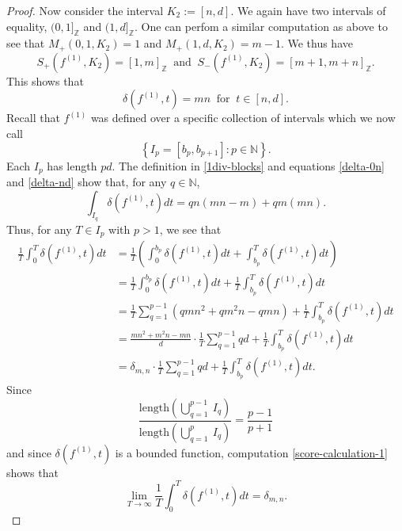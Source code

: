 \documentclass[reqno,11pt]{amsart}
\theoremstyle{plain}
\theoremstyle{definition}
\theoremstyle{remark}
\numberwithin{equation}{section}
\newcommand{\Z}{{\mathbb{Z}}}
\newcommand{\N}{{\mathbb{N}}}
\begin{document}
\begin{proof}
Now consider the interval $K_2:=[n,d]$. We again have two intervals of equality, $(0,1]_\Z$ and $(1,d]_\Z$.
One can perfom a similar computation as above to see that $M_+(0,1,K_2) = 1$ and $M_+(1,d,K_2) = m-1$.
We thus have
\begin{equation*}
    S_+(f^{(1)}, K_2)  = [1,m]_\Z\ \text{ and }\ S_-(f^{(1)}, K_2) = 
     [m+1, m+n]_\Z.
\end{equation*}
This shows that
\begin{equation}\label{delta-nd}
    \delta(f^{(1)}, t) = mn\ \text{ for }\ t \in [n,d].
\end{equation}
Recall that $f^{(1)}$ was defined over a specific collection of intervals which we now call
\begin{equation*}
    \left\lbrace I_p = [b_p, b_{p+1}]: p \in \N \right\rbrace. \end{equation*}
    Each $I_p$ has length $pd$.
    The definition in \eqref{1div-blocks} and equations \eqref{delta-0n} and \eqref{delta-nd} show that, for any $q \in \N$,
    \begin{equation}
        \int_{I_q} \delta(f^{(1)},t) dt = qn (mn - m) + qm (mn).
    \end{equation}
    Thus, for any $T \in I_p$ with $p >1$, we see that 
    \begin{equation}\label{score-calculation-1}
    \begin{split}
        \frac{1}{T}\int_0^T \delta(f^{(1)}, t) dt &=  \frac{1}{T} \left( \int_0^{b_p} \delta(f^{(1)},t) dt + \int^T_{b_p}\delta(f^{(1)},t) dt\right)
        \\ 
        &=  \frac{1}{T}  \int_0^{b_p} \delta(f^{(1)},t) dt + \frac{1}{T} \int^{T}_{b_p} \delta(f^{(1)}, t) dt
        \\
        &= \frac{1}{T} \sum_{q=1}^{p-1} \left(qmn^2 + qm^2n - qmn  \right) + \frac{1}{T} \int_{b_p}^T \delta(f^{(1)},t)dt
        \\
        &= \frac{mn^2 + m^2n - mn}{d}\cdot \frac{1}{T} \sum_{q=1}^{p-1} qd + \frac{1}{T} \int_{b_p}^T \delta(f^{(1)},t)dt
        \\
        &= \delta_{m,n} \cdot \frac{1}{T} \sum_{q=1}^{p-1} qd + \frac{1}{T} \int_{b_p}^T \delta(f^{(1)},t)dt.
        \end{split} 
    \end{equation}
Since
\begin{equation}\label{add-insignificant}
    \frac{\text{length}\left(\bigcup^{p-1}_{q=1}\ I_q\right)}{\text{length}\left(\bigcup^{p}_{q=1}\ I_q\right)} = \frac{p-1}{p+1}
\end{equation}
and since $\delta(f^{(1)},t)$ is a bounded function,
computation \eqref{score-calculation-1} shows that
\begin{equation}
    \lim_{T\to \infty} \frac{1}{T}\int_0^T \delta(f^{(1)}, t) dt = \delta_{m,n}.
\end{equation}


\end{proof}
\end{document}

